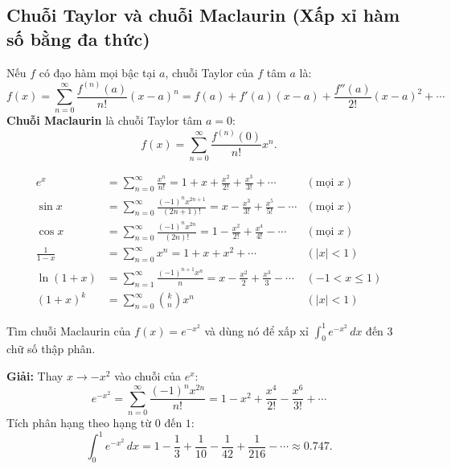 \documentclass[12pt,a4paper]{article}
\begin{document}
\subsection{Chuỗi Taylor và chuỗi Maclaurin (Xấp xỉ hàm số bằng đa thức)}

\begin{dinhnghia}[title={Chuỗi Taylor và Maclaurin}]
  Nếu $f$ có đạo hàm mọi bậc tại $a$, chuỗi Taylor của $f$ tâm $a$ là:
  \[
    f(x) = \sum_{n=0}^\infty \frac{f^{(n)}(a)}{n!}(x-a)^n = f(a) + f'(a)(x-a) + \frac{f''(a)}{2!}(x-a)^2 + \cdots
  \]
  \textbf{Chuỗi Maclaurin} là chuỗi Taylor tâm $a = 0$:
  \[
    f(x) = \sum_{n=0}^\infty \frac{f^{(n)}(0)}{n!} x^n.
  \]
\end{dinhnghia}

\begin{congthuc}[title={Các chuỗi Maclaurin quan trọng}]
  \begin{align*}
    e^x &= \sum_{n=0}^\infty \frac{x^n}{n!} = 1 + x + \frac{x^2}{2!} + \frac{x^3}{3!} + \cdots & (\text{mọi } x) \\[4pt]
    \sin x &= \sum_{n=0}^\infty \frac{(-1)^n x^{2n+1}}{(2n+1)!} = x - \frac{x^3}{3!} + \frac{x^5}{5!} - \cdots & (\text{mọi } x) \\[4pt]
    \cos x &= \sum_{n=0}^\infty \frac{(-1)^n x^{2n}}{(2n)!} = 1 - \frac{x^2}{2!} + \frac{x^4}{4!} - \cdots & (\text{mọi } x) \\[4pt]
    \frac{1}{1-x} &= \sum_{n=0}^\infty x^n = 1 + x + x^2 + \cdots & (|x| < 1) \\[4pt]
    \ln(1+x) &= \sum_{n=1}^\infty \frac{(-1)^{n+1} x^n}{n} = x - \frac{x^2}{2} + \frac{x^3}{3} - \cdots & (-1 < x \le 1) \\[4pt]
    (1+x)^k &= \sum_{n=0}^\infty \binom{k}{n} x^n & (|x|<1)
  \end{align*}
\end{congthuc}

\begin{vidu}
  Tìm chuỗi Maclaurin của $f(x) = e^{-x^2}$ và dùng nó để xấp xỉ $\displaystyle\int_0^1 e^{-x^2}\,dx$ đến 3 chữ số thập phân.

  \medskip\textbf{Giải:}
  Thay $x \to -x^2$ vào chuỗi của $e^x$:
  \[
    e^{-x^2} = \sum_{n=0}^\infty \frac{(-1)^n x^{2n}}{n!} = 1 - x^2 + \frac{x^4}{2!} - \frac{x^6}{3!} + \cdots
  \]
  Tích phân hạng theo hạng từ $0$ đến $1$:
  \[
    \int_0^1 e^{-x^2}\,dx = 1 - \frac{1}{3} + \frac{1}{10} - \frac{1}{42} + \frac{1}{216} - \cdots \approx 0.747.
  \]
\end{vidu}
\end{document}
